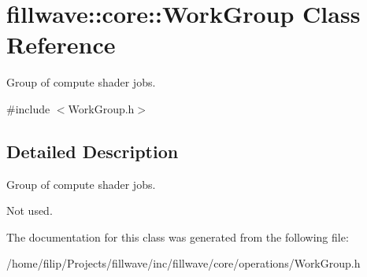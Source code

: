 \hypertarget{classfillwave_1_1core_1_1WorkGroup}{}\section{fillwave\+:\+:core\+:\+:Work\+Group Class Reference}
\label{classfillwave_1_1core_1_1WorkGroup}


Group of compute shader jobs.  




{\ttfamily \#include $<$Work\+Group.\+h$>$}



\subsection{Detailed Description}
Group of compute shader jobs. 

Not used. 

The documentation for this class was generated from the following file\+:\begin{DoxyCompactItemize}
\item 
/home/filip/\+Projects/fillwave/inc/fillwave/core/operations/Work\+Group.\+h\end{DoxyCompactItemize}
